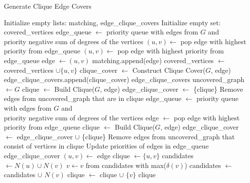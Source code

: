 \begin{algorithm}
\caption{Generate Clique Edge Covers}
\fontsize{10}{12}\selectfont
\begin{algorithmic}[1]
\State Initialize empty lists: matching, edge\_clique\_covers
\State Initialize empty set: covered\_vertices
\State edge\_queue $\gets$ priority queue with edges from $G$ and\\\hspace{2.7cm} priority negative sum of degrees of the vertices
    \State $(u, v)\gets$ pop edge with highest priority from edge\_queue
        \State $(u, v)\gets$ pop edge with highest priority from edge\_queue
    \EndWhile
    \State edge $\gets (u, v)$
    \State matching.append(edge)
    \State covered\_vertices $\gets$ covered\_vertices $\cup \{u, v\}$
\EndFor
{}
    \State clique\_cover $\gets$ Construct Clique Cover($G$, edge)
    \State edge\_clique\_covers.append(clique\_cover)
\EndFor
\State \Return edge\_clique\_covers
\EndProcedure
{}
\State uncovered\_graph $\gets G$
\State clique $\gets$ Build Clique($G$, edge)
\State edge\_clique\_cover $\gets$ \{clique\}
\State Remove edges from uncovered\_graph that are in clique
\State edge\_queue $\gets$ priority queue with edges from $G$ and\\\hspace{2.7cm} priority negative sum of degrees of the vertices
    \State edge $\gets$ pop edge with highest priority from edge\_queue
    \State clique $\gets$ Build Clique($G$, edge)
    \State edge\_clique\_cover $\gets$ edge\_clique\_cover $\cup$ \{clique\}
    \State Remove edges from uncovered\_graph that consist of vertices in clique
    \State Update priorities of edges in edge\_queue
\EndWhile
\State \Return edge\_clique\_cover
\EndProcedure
{}
\State $(u, v)\gets$ edge
\State clique $\gets \{u, v\}$
\State candidates $\gets N(u)\cup N(v)$
    \State $v\gets v$ from candidates with max($\delta(v)$)
    \State candidates $\gets$ candidates $\cup$ $N(v)$
    \State clique $\gets$ clique $\cup$ $\{v\}$
\EndWhile
\State \Return clique
\EndProcedure
\end{algorithmic}
\end{algorithm}

